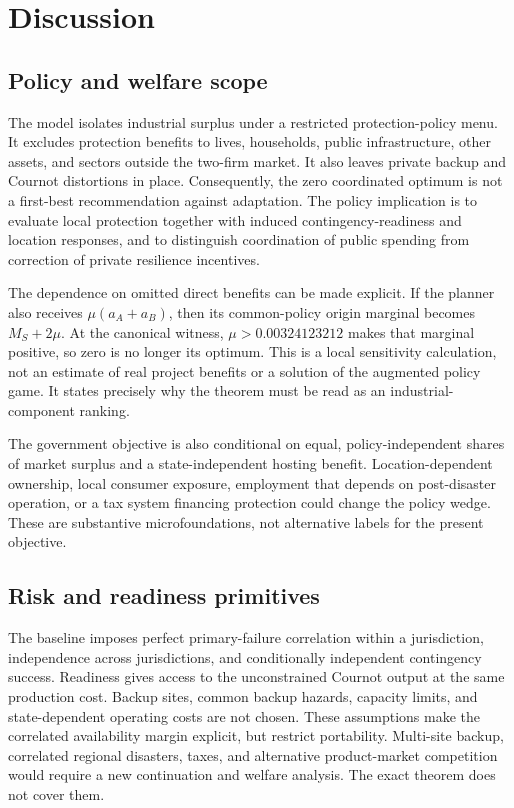 \section{Discussion}\label{sec:discussion}

\subsection{Policy and welfare scope}

The model isolates industrial surplus under a restricted protection-policy menu. It excludes protection benefits to lives, households, public infrastructure, other assets, and sectors outside the two-firm market. It also leaves private backup and Cournot distortions in place. Consequently, the zero coordinated optimum is not a first-best recommendation against adaptation. The policy implication is to evaluate local protection together with induced contingency-readiness and location responses, and to distinguish coordination of public spending from correction of private resilience incentives.

The dependence on omitted direct benefits can be made explicit. If the planner also receives $\mu(a_A+a_B)$, then its common-policy origin marginal becomes $M_S+2\mu$. At the canonical witness, $\mu>0.00324123212$ makes that marginal positive, so zero is no longer its optimum. This is a local sensitivity calculation, not an estimate of real project benefits or a solution of the augmented policy game. It states precisely why the theorem must be read as an industrial-component ranking.

The government objective is also conditional on equal, policy-independent shares of market surplus and a state-independent hosting benefit. Location-dependent ownership, local consumer exposure, employment that depends on post-disaster operation, or a tax system financing protection could change the policy wedge. These are substantive microfoundations, not alternative labels for the present objective.

\subsection{Risk and readiness primitives}

The baseline imposes perfect primary-failure correlation within a jurisdiction, independence across jurisdictions, and conditionally independent contingency success. Readiness gives access to the unconstrained Cournot output at the same production cost. Backup sites, common backup hazards, capacity limits, and state-dependent operating costs are not chosen. These assumptions make the correlated availability margin explicit, but restrict portability. Multi-site backup, correlated regional disasters, taxes, and alternative product-market competition would require a new continuation and welfare analysis. The exact theorem does not cover them.

